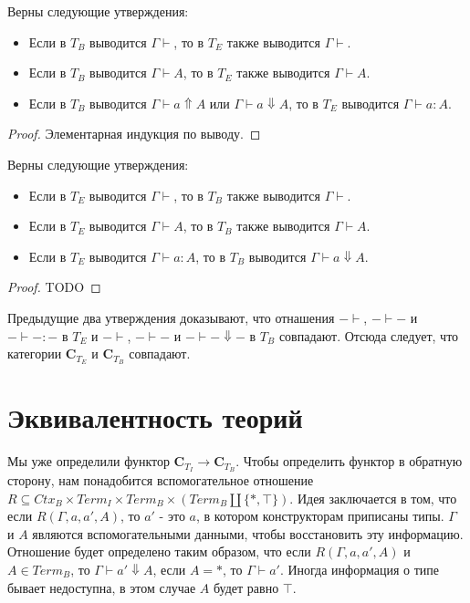 \documentclass{amsart}
\theoremstyle{definition}
\theoremstyle{remark}
\newcommand{\cat}[1]{\mathbf{#1}}
\renewcommand{\C}{\cat{C}}
\numberwithin{figure}{section}
\begin{document}
\begin{prop}
Верны следующие утверждения:
\begin{itemize}
\item Если в $T_B$ выводится $\Gamma \vdash$, то в $T_E$ также выводится $\Gamma \vdash$.
\item Если в $T_B$ выводится $\Gamma \vdash A$, то в $T_E$ также выводится $\Gamma \vdash A$.
\item Если в $T_B$ выводится $\Gamma \vdash a \Uparrow A$ или $\Gamma \vdash a \Downarrow A$, то в $T_E$ выводится $\Gamma \vdash a : A$.
\end{itemize}
\end{prop}
\begin{proof}
Элементарная индукция по выводу.
\end{proof}

\begin{prop}
Верны следующие утверждения:
\begin{itemize}
\item Если в $T_E$ выводится $\Gamma \vdash$, то в $T_B$ также выводится $\Gamma \vdash$.
\item Если в $T_E$ выводится $\Gamma \vdash A$, то в $T_B$ также выводится $\Gamma \vdash A$.
\item Если в $T_E$ выводится $\Gamma \vdash a : A$, то в $T_B$ выводится $\Gamma \vdash a \Downarrow A$.
\end{itemize}
\end{prop}
\begin{proof}
TODO
\end{proof}

Предыдущие два утверждения доказывают, что отнашения $- \vdash$, $- \vdash -$ и $- \vdash - : -$ в $T_E$ и $- \vdash$, $- \vdash -$ и $- \vdash - \Downarrow -$ в $T_B$ совпадают.
Отсюда следует, что категории $\C_{T_E}$ и $\C_{T_B}$ совпадают.

\section{Эквивалентность теорий}

Мы уже определили функтор $\C_{T_I} \to \C_{T_B}$.
Чтобы определить функтор в обратную сторону, нам понадобится вспомогательное отношение $R \subseteq Ctx_B \times Term_I \times Term_B \times (Term_B \amalg \{ *, \top \})$.
Идея заключается в том, что если $R(\Gamma, a, a', A)$, то $a'$ - это $a$, в котором конструкторам приписаны типы.
$\Gamma$ и $A$ являются вспомогательными данными, чтобы восстановить эту информацию.
Отношение будет определено таким образом, что если $R(\Gamma, a, a', A)$ и $A \in Term_B$, то $\Gamma \vdash a' \Downarrow A$, если $A = *$, то $\Gamma \vdash a'$.
Иногда информация о типе бывает недоступна, в этом случае $A$ будет равно $\top$.
\end{document}
